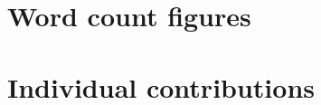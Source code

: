 \begin{appendices}
\section{Word count figures}
\label{appendix:countfigs}


\section{Individual contributions}

\end{appendices}